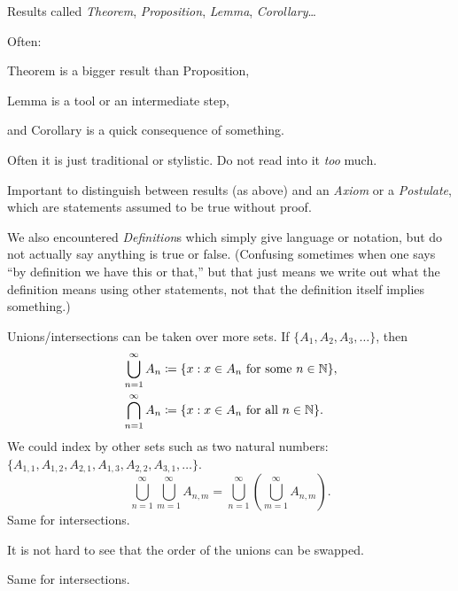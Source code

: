 \documentclass[10pt,aspectratio=169]{beamer}
\begin{document}
\begin{frame}
Results called \emph{Theorem}, \emph{Proposition}, \emph{Lemma},
\emph{Corollary}\ldots

\medskip
\pause

Often:

Theorem is a bigger result than Proposition,

\pause
Lemma is a tool or an intermediate step,

\pause
and Corollary is a quick consequence of something.

\medskip
\pause

Often it is just traditional or stylistic.  Do not read into it
\emph{too} much.

\medskip
\pause

Important to distinguish between results (as above)
and an \emph{Axiom}
or a \emph{Postulate}, which are statements assumed to be true
without proof.

\medskip
\pause

We also encountered \emph{Definition}s which simply give language or
notation, but do not actually say anything is true or false.
\pause
(Confusing sometimes when one says ``by definition we have this or that,''
but that just means we write out what the definition means using other
statements, not that the definition itself implies something.)

\end{frame}

\begin{frame}
Unions/intersections can be taken over more sets.
\pause
If
$\{ A_1, A_2, A_3, \ldots \}$,
\pause
then
\begin{align*}
& \bigcup_{n=1}^\infty A_n \coloneqq \{ x : x \in A_n \text{ for some } n \in {\mathbb{N}}
\} , \\
& \bigcap_{n=1}^\infty A_n \coloneqq \{ x : x \in A_n \text{ for all } n \in {\mathbb{N}}
\} .
\end{align*}
\pause
We could index by other sets such as two natural numbers:
$\{ A_{1,1}, A_{1,2}, A_{2,1}, A_{1,3}, A_{2,2}, A_{3,1}, \ldots \}$.
\pause
\begin{equation*}
\bigcup_{n=1}^\infty \bigcup_{m=1}^\infty A_{n,m}
=
\bigcup_{n=1}^\infty \left( \bigcup_{m=1}^\infty A_{n,m} \right) .
\end{equation*}
\pause
Same for intersections.
\pause

\medskip
It is not hard to see that the order of the unions can be swapped.

Same for intersections.

\end{frame}
\end{document}
